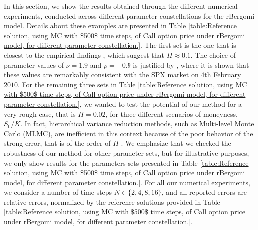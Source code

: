 In this section, we show the results obtained through the different numerical experiments,  conducted across different parameter constellations for the rBergomi model. Details about these examples are presented in Table \ref{table:Reference solution, using MC with $500$ time steps, of Call option price under rBergomi model, for different parameter constellation.}. The first set is the one that is closest to the empirical findings \cite{bennedsen2016decoupling,gatheral2018volatility}, which suggest that $H \approx 0.1$. The choice of parameter values of $\nu= 1.9$ and $\rho=-0.9$ is justified by \cite{bayer2016pricing}, where it is shown that these values are remarkably consistent with the SPX market on $4$th February $2010$. For the remaining three sets in Table \ref{table:Reference solution, using MC with $500$ time steps, of Call option price under rBergomi model, for different parameter constellation.}, we wanted to test the potential of our method for a very rough case, that is $H=0.02$, for three different  scenarios  of moneyness, $S_0/K$. In fact, hierarchical variance reduction methods, such as Multi-level Monte Carlo (MLMC), are inefficient in this context because of the poor behavior of the strong error, that is of the order of $H$ \cite{neuenkirch2016order}. We emphasize that we checked the robustness of our method for other parameter sets, but for illustrative purposes, we only show results for the parameters sets presented in Table \ref{table:Reference solution, using MC with $500$ time steps, of Call option price under rBergomi model, for different parameter constellation.}. For all our numerical experiments, we consider   a number of time steps $N \in \{2,4,8,16\}$, and  all reported errors are relative errors, normalized by the reference solutions provided in Table \ref{table:Reference solution, using MC with $500$ time steps, of Call option price under rBergomi model, for different parameter constellation.}.

